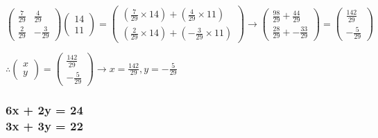 \documentclass{article}
\begin{document}
\[
	\begin{pmatrix}
		\frac{7}{29} & \frac{4}{29}\\
		\frac{2}{29} & -\frac{3}{29}
	\end{pmatrix}
	\begin{pmatrix}
		14\\
		11
	\end{pmatrix}
	=
	\begin{pmatrix}
		(\frac{7}{29}\times14)+(\frac{4}{29}\times11)\\
		(\frac{2}{29}\times14)+(-\frac{3}{29}\times11)
	\end{pmatrix}
	\rightarrow
	\begin{pmatrix}
		\frac{98}{29} + \frac{44}{29}\\
		\frac{28}{29} + -\frac{33}{29}
	\end{pmatrix}
	=
	\begin{pmatrix}
		\frac{142}{29}\\
		-\frac{5}{29}
	\end{pmatrix}
\]
\begin{center}\vspace{0.5cm}$\therefore
	\begin{pmatrix}
		x\\
		y
	\end{pmatrix}
	= 
	\begin{pmatrix}
		\frac{142}{29}\\
		-\frac{5}{29}
	\end{pmatrix}
	\rightarrow
x = \frac{142}{29}, y = -\frac{5}{29}$\end{center}
\subsubsection{6x + 2y = 24 \\ 3x + 3y = 22}
\end{document}
